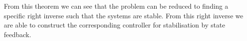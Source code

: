 From this theorem we can see that the problem can be reduced to finding a specific right inverse such that the systems are stable. From this right inverse we are able to construct the corresponding controller for stabilisation by state feedback.






